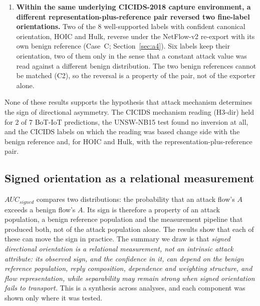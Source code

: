 \documentclass[preprint,12pt]{elsarticle}
\begin{document}
\begin{enumerate}
\item \textbf{Within the same underlying CICIDS-2018 capture environment, a different representation-plus-reference pair reversed two fine-label orientations.} Two of the 8 well-supported labels with confident canonical orientation, HOIC and Hulk, reverse under the NetFlow-v2 re-export with its own benign reference (Case~C; Section~\ref{sec:a4}). Six labels keep their orientation, two of them only in the sense that a constant attack value was read against a different benign distribution. The two benign references cannot be matched (C2), so the reversal is a property of the pair, not of the exporter alone.
\end{enumerate}

None of these results supports the hypothesis that attack mechanism determines the sign of directional asymmetry. The CICIDS mechanism reading (H3-dir) held for 2 of 7 BoT-IoT predictions, the UNSW-NB15 test found no inversion at all, and the CICIDS labels on which the reading was based change side with the benign reference and, for HOIC and Hulk, with the representation-plus-reference pair.

\subsection{Signed orientation as a relational measurement}\label{sec:disc-relational}

$AUC_{signed}$ compares two distributions: the probability that an attack flow's $A$ exceeds a benign flow's $A$. Its sign is therefore a property of an attack population, a benign reference population and the measurement pipeline that produced both, not of the attack population alone. The results show that each of these can move the sign in practice. The summary we draw is that \emph{signed directional orientation is a relational measurement, not an intrinsic attack attribute: its observed sign, and the confidence in it, can depend on the benign reference population, reply composition, dependence and weighting structure, and flow representation, while separability may remain strong when signed orientation fails to transport.} This is a synthesis across analyses, and each component was shown only where it was tested.
\end{document}
